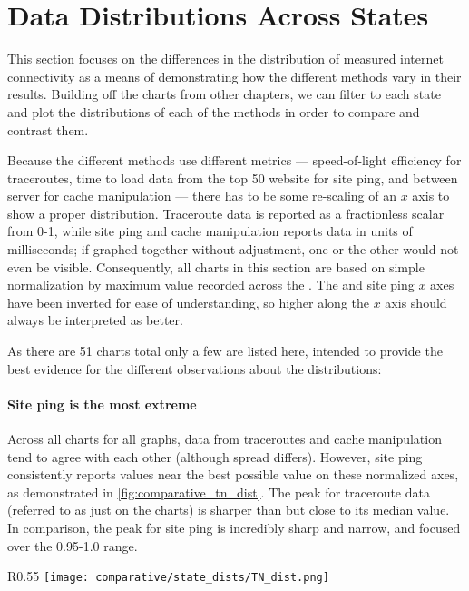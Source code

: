 \section{Data Distributions Across States}\label{sec:comparative-distribution}

This section focuses on the differences in the distribution of measured internet connectivity as a means of demonstrating how the different methods vary in their results. Building off the \kde charts from other chapters, we can filter to each state and plot the distributions of each of the methods in order to compare and contrast them.

Because the different methods use different metrics --- speed-of-light efficiency for traceroutes, time to load data from the top 50 website for site ping, and \rtt between \dns server for \dns cache manipulation --- there has to be some re-scaling of an $x$ axis to show a proper distribution. Traceroute data is reported as a fractionless scalar from 0-1, while site ping and \dns cache manipulation reports data in units of milliseconds; if graphed together without adjustment, one or the other would not even be visible. Consequently, all charts in this section are based on simple normalization by maximum value recorded across the \us. The \dns and site ping $x$ axes have been inverted for ease of understanding, so higher along the $x$ axis should always be interpreted as better.

As there are 51 charts total only a few are listed here, intended to provide the best evidence for the different observations about the distributions:

\paragraph{Site ping is the most extreme} Across all \kde charts for all graphs, data from traceroutes and \dns cache manipulation tend to agree with each other (although spread differs). However, site ping consistently reports values near the best possible value on these normalized axes, as demonstrated in \cref{fig:comparative_tn_dist}. The peak for traceroute data (referred to as just \caida on the charts) is sharper than \dns but close to its median value. In comparison, the peak for site ping is incredibly sharp and narrow, and focused over the 0.95-1.0 range.

\begin{wrapfigure}[16]{R}{0.55\textwidth}
    \centering
    \texttt{[image: comparative/state\_dists/TN\_dist.png]}
    \caption{Tennessee data distributions}
    \label{fig:comparative_tn_dist}
\end{wrapfigure}

